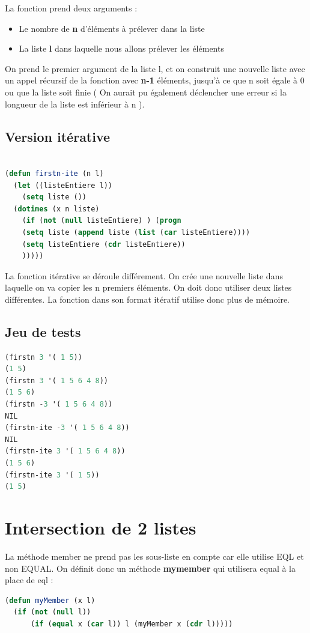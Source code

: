 \documentclass[a4paper,10pt]{report}
\begin{document}
  La fonction prend deux arguments :
  \begin{itemize}
   \item Le nombre de \textbf{n} d'éléments à prélever dans la liste
   \item La liste \textbf{l} dans laquelle nous allons prélever les éléments
  \end{itemize}
  On prend le premier argument de la liste l, et on construit une nouvelle liste avec un appel récursif de la fonction avec \textbf{n-1} éléments, 
  jusqu'à ce que n soit égale à 0 ou que la liste soit finie ( On aurait pu également déclencher une erreur si la longueur de la liste est inférieur à n ). \newline
    \subsection{Version itérative}
  \begin{lstlisting}[language=Lisp]
    
(defun firstn-ite (n l)
  (let ((listeEntiere l))
    (setq liste ())
  (dotimes (x n liste)
    (if (not (null listeEntiere) ) (progn 
    (setq liste (append liste (list (car listeEntiere))))
    (setq listeEntiere (cdr listeEntiere))
    )))))

  \end{lstlisting}
  
  La fonction itérative se déroule différement. On crée une nouvelle liste dans laquelle on va copier les n premiers éléments. 
  On doit donc utiliser deux listes différentes. La fonction dans son format itératif utilise donc plus de mémoire. 
	  \subsection{Jeu de tests}
	  	\begin{lstlisting}[language=Lisp]
(firstn 3 '( 1 5))
(1 5)
(firstn 3 '( 1 5 6 4 8))
(1 5 6)
(firstn -3 '( 1 5 6 4 8))
NIL
(firstn-ite -3 '( 1 5 6 4 8))
NIL
(firstn-ite 3 '( 1 5 6 4 8))
(1 5 6)
(firstn-ite 3 '( 1 5))
(1 5)
		 \end{lstlisting}

    \newpage
    \section{Intersection de 2 listes}
    
    La méthode member ne prend pas les sous-liste en compte car elle utilise EQL et non EQUAL. On définit donc un méthode \textbf{mymember} qui utilisera equal à la place de eql :
\begin{lstlisting}[language=Lisp]
(defun myMember (x l)
  (if (not (null l))
      (if (equal x (car l)) l (myMember x (cdr l)))))
\end{lstlisting}
    
\end{document}
